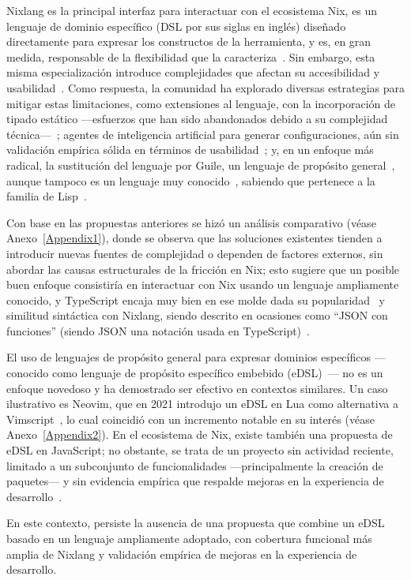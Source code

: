 Nixlang es la principal interfaz para interactuar con el ecosistema Nix, es un lenguaje de dominio específico (DSL por sus siglas en inglés) diseñado directamente para expresar los constructos de la herramienta, y es, en gran medida, responsable de la flexibilidad que la caracteriza~\cite{NixdevDocumentation}. Sin embargo, esta misma especialización introduce complejidades que afectan su accesibilidad y usabilidad~\cite{Dolstra2018}. Como respuesta, la comunidad ha explorado diversas estrategias para mitigar estas limitaciones, como extensiones al lenguaje, con la incorporación de tipado estático ---esfuerzos que han sido abandonados debido a su complejidad técnica---~\cite{caddetNixNickel,hufschmittCurrentStatePtyx}; agentes de inteligencia artificial para generar configuraciones, aún sin validación empírica sólida en términos de usabilidad~\cite{Schwaighofer2026}; y, en un enfoque más radical, la sustitución del lenguaje por Guile, un lenguaje de propósito general~\cite{Courts2013}, aunque tampoco es un lenguaje muy conocido~\cite{stackoverflowMostPopularTechnologies}, sabiendo que pertenece a la familia de Lisp~\cite{IntroductionGuileReference}.

Con base en las propuestas anteriores se hizó un análisis comparativo (véase Anexo~\ref{Appendix1}), donde se observa que las soluciones existentes tienden a introducir nuevas fuentes de complejidad o dependen de factores externos, sin abordar las causas estructurales de la fricción en Nix; esto sugiere que un posible buen enfoque consistiría en interactuar con Nix usando un lenguaje ampliamente conocido, y TypeScript encaja muy bien en ese molde dada su popularidad~\cite{stackoverflowMostPopularTechnologies} y similitud sintáctica con Nixlang, siendo descrito en ocasiones como ``JSON con funciones'' (siendo JSON una notación usada en TypeScript)~\cite{NixdevDocumentation}.

El uso de lenguajes de propósito general para expresar dominios específicos ---conocido como lenguaje de propósito específico embebido (eDSL)~\cite{vandeursenDomainspecificLanguagesAnnotated2000}--- no es un enfoque novedoso y ha demostrado ser efectivo en contextos similares. Un caso ilustrativo es Neovim, que en 2021 introdujo un eDSL en Lua como alternativa a Vimscript~\cite{NeovimNews112021}, lo cual coincidió con un incremento notable en su interés (véase Anexo~\ref{Appendix2}). En el ecosistema de Nix, existe también una propuesta de eDSL en JavaScript; no obstante, se trata de un proyecto sin actividad reciente, limitado a un subconjunto de funcionalidades ---principalmente la creación de paquetes--- y sin evidencia empírica que respalde mejoras en la experiencia de desarrollo~\cite{burgNiJSInternalDSL2026}.

En este contexto, persiste la ausencia de una propuesta que combine un eDSL basado en un lenguaje ampliamente adoptado, con cobertura funcional más amplia de Nixlang y validación empírica de mejoras en la experiencia de desarrollo.
